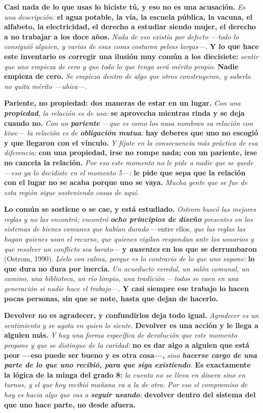 \documentclass[11pt,letterpaper]{article}
\newcommand{\milcpaso}[3]{%
\Needspace{4\baselineskip}%
\begin{tcolorbox}[enhanced,colback=white,colframe=milcLinea,arc=1.5mm,boxrule=.9pt,
  left=14mm,right=4mm,top=3mm,bottom=3mm,before skip=4pt,after skip=4pt,
  fontupper=\RaggedRight,
  overlay={\node[anchor=north west,circle,fill=#2,text=white,inner sep=0pt,
    minimum size=7.4mm,font=\sffamily\bfseries\small]
    at ([xshift=3.6mm,yshift=-3.2mm]frame.north west) {#1};}]
#3
\end{tcolorbox}}
\begin{document}
\milcpaso{1}{milcTurquesa}{\textbf{Casi nada de lo que usas lo hiciste tú, y eso no es una acusación.} \emph{Es una descripción:} \textbf{el agua potable, la vía, la escuela pública, la vacuna, el alfabeto, la electricidad, el derecho a estudiar siendo mujer, el derecho a no trabajar a los doce años.} \emph{Nada de eso existía por defecto ---todo lo consiguió alguien, y varias de esas cosas costaron peleas largas---.} \textbf{Y lo que hace este inventario es corregir una ilusión muy común a los diecisiete:} \emph{sentir que uno empieza de cero y que todo lo que tenga será mérito propio}. \textbf{Nadie empieza de cero.} \emph{Se empieza dentro de algo que otros construyeron, y saberlo no quita mérito ---ubica---.}}
\milcpaso{2}{milcTurquesa}{\textbf{Pariente, no propiedad: dos maneras de estar en un lugar.} \emph{Con una \textbf{propiedad}, la relación es de uso:} \textbf{se aprovecha mientras rinda y se deja cuando no.} \emph{Con un \textbf{pariente} ---que es como los nasa nombran su relación con kiwe--- la relación es de \textbf{obligación mutua}:} \textbf{hay deberes que uno no escogió y que llegaron con el vínculo.} \emph{Y fíjate en la consecuencia más práctica de esa diferencia:} \textbf{con una propiedad, irse no rompe nada; con un pariente, irse no cancela la relación.} \emph{Por eso este momento no le pide a nadie que se quede ---eso ya lo decidiste en el momento 5---:} \textbf{le pide que sepa que la relación con el lugar no se acaba porque uno se vaya.} \emph{Mucha gente que se fue de esta región sigue sosteniendo cosas de aquí.}}
\milcpaso{3}{milcTurquesa}{\textbf{Lo común se sostiene o se cae, y está estudiado.} \emph{Ostrom buscó las mejores reglas y no las encontró; encontró \textbf{ocho principios de diseño} presentes en los sistemas de bienes comunes que habían durado} ---entre ellos, \emph{que las reglas las hagan quienes usan el recurso, que quienes vigilan respondan ante los usuarios y que resolver un conflicto sea barato}--- \textbf{y \emph{ausentes} en los que se derrumbaron} (Ostrom, 1990). \emph{Léelo con calma, porque es lo contrario de lo que uno supone:} \textbf{lo que dura no dura por inercia.} \emph{Un acueducto veredal, un salón comunal, un camino, una biblioteca, un río limpio, una tradición ---todos se caen en una generación si nadie hace el trabajo---.} \textbf{Y casi siempre ese trabajo lo hacen pocas personas, sin que se note, hasta que dejan de hacerlo.}}
\milcpaso{4}{milcTurquesa}{\textbf{Devolver no es agradecer, y confundirlos deja todo igual.} \emph{Agradecer es un sentimiento y se agota en quien lo siente.} \textbf{Devolver es una acción y le llega a alguien más.} \emph{Y hay una forma específica de devolución que este momento propone y que se distingue de la caridad:} \textbf{no es dar algo a alguien que está peor ---eso puede ser bueno y es otra cosa---,} \emph{sino \textbf{hacerse cargo de una parte de lo que uno recibió, para que siga existiendo}.} \textbf{Es exactamente la lógica de la minga del grado 8:} \emph{la cuenta no se lleva en dinero sino en turnos, y el que hoy recibió mañana va a la de otro.} \emph{Por eso el compromiso de hoy es hacia algo que vas a \textbf{seguir usando}:} \textbf{devolver dentro del sistema del que uno hace parte, no desde afuera.}}
\end{document}
